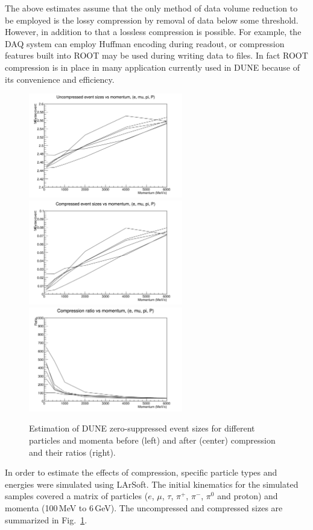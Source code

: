 The above estimates assume that the only method of data volume reduction to be employed is the
lossy compression by removal of data below some threshold.
However, in addition to that
a lossless compression is possible. For example, the DAQ system can employ Huffman encoding
during readout, or compression features built into ROOT may be used during writing data to files.
In fact ROOT compression is in place in many application currently used in DUNE because of its
convenience and efficiency.
\begin{figure}
	\centering
	\includegraphics[width=0.6\textwidth]{btot.png}
	\includegraphics[width=0.6\textwidth]{bzip.png}
	\includegraphics[width=0.6\textwidth]{brat.png}
	\caption{Estimation of DUNE zero-suppressed event sizes for different particles and momenta before (left) and after (center)  compression and their ratios (right).}
	\label{fig:data-compression}
\end{figure}
In order to estimate the effects of compression, specific particle types and energies were simulated using LArSoft.
The initial kinematics for the simulated samples covered a matrix of
particles ($e$, $\mu$, $\tau$, $\pi^+$, $\pi^-$, $\pi^0$ and proton) and momenta
(100\,MeV to 6\,GeV). The uncompressed and compressed sizes are summarized in Fig.~\ref{fig:data-compression}.

